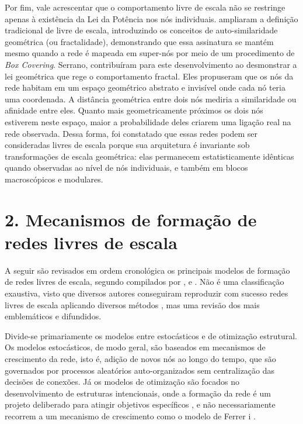 \documentclass[12pt,oneside,a4paper,brazil,sumario=tradicional]{abntex2}
\begin{document}
Por fim, vale acrescentar que o comportamento livre de escala não se restringe apenas à existência da Lei da Potência nos nós individuais.  ampliaram a definição tradicional de livre de escala, introduzindo os conceitos de auto-similaridade geométrica (ou fractalidade), demonstrando que essa assinatura se mantém mesmo quando a rede é mapeada em super-nós por meio de um procedimento de \textit{Box Covering}. Serrano,  contribuíram para este desenvolvimento ao desmonstrar a lei geométrica que rege o comportamento fractal. Eles propuseram que os nós da rede habitam em um espaço geométrico abstrato e invisível onde cada nó teria uma coordenada. A distância geométrica entre  dois nós mediria a similaridade ou afinidade entre eles. Quanto mais geometricamente próximos os dois nós estiverem neste espaço, maior a probabilidade deles criarem uma ligação real na rede observada. Dessa forma, foi constatado que essas redes podem ser consideradas livres de escala porque sua arquitetura é invariante sob transformações de escala geométrica: elas permanecem estatisticamente idênticas quando observadas ao nível de nós individuais, e também em blocos macroscópicos e modulares.

\section*{2. Mecanismos de formação de redes livres de escala}
A seguir são revisados em ordem cronológica os principais modelos de formação de redes livres de escala, segundo compilados por , e . Não é uma classificação exaustiva, visto que diversos autores conseguiram reproduzir  com sucesso redes livres de escala aplicando diversos métodos \cite{barabasi2001, caldarelli2002, xu2010, papadopoulos2012}, mas uma revisão dos mais emblemáticos e difundidos.

Divide-se primariamente os modelos entre estocásticos e de otimização estrutural. Os modelos estocásticos, de modo geral, são baseados em mecanismos de crescimento da rede, isto é, adição de novos nós ao longo do tempo, que são governados por processos aleatórios auto-organizados sem centralização das decisões de conexões. Já os modelos de otimização são focados no desenvolvimento de estruturas intencionais, onde a formação da rede é um projeto deliberado para atingir objetivos específicos \cite{newman2010}, e não necessariamente recorrem a um mecanismo de crescimento como o modelo de Ferrer i .
\end{document}
